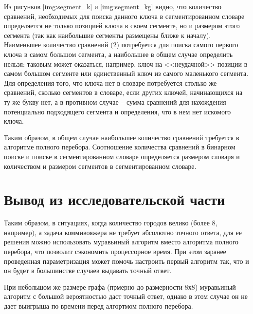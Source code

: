 Из рисунков \ref{img:segment_k} и \ref{img:segment_kg} видно, что количество сравнений, необходимых для поиска данного ключа в сегментированном словаре определяется не только позицией ключа в своем сегменте, но и размером этого сегмента (так как наибольшие сегменты размещены ближе к началу). Наименьшее количество сравнений (2) потребуется для поиска самого первого ключа в самом большом сегмента, а наибольшее в общем случае определить нельзя: таковым может оказаться, например, ключ на <<неудачной>> позиции в самом большом сегменте или единственный ключ из самого маленького сегмента. Для определения того, что ключа нет в словаре потребуется столько же сравнений, сколько сегментов в словаре, если других ключей, начинающихся на ту же букву нет, а в противном случае -- сумма сравнений для нахождения потенциально подходящего сегмента и определения, что в нем нет искомого ключа.

Таким образом, в общем случае наибольшее количество сравнений требуется в алгоритме полного перебора. Соотношение количества сравнений в бинарном поиске и поиске в сегментированном словаре определяется размером словаря и количеством и размером сегментов в сегментированном словаре.

\clearpage
\section{Вывод из исследовательской части}

Таким образом, в ситуациях, когда количество городов велико (более 8, например), а задача коммивояжера не требует абсолютно точного ответа, для ее решения можно использовать муравьиный алгоритм вместо алгоритма полного перебора, что позволит сэкономить процессорное время. При этом заранее проведенная параметризация может помочь настроить первый алгоритм так, что и он будет в большинстве случаев выдавать точный ответ. 

При небольшом же размере графа (прмерно до размерности 8х8) муравьиный алгоритм с большой вероятностью даст точный ответ, однако в этом случае он не дает выигрыша по времени перед алгортмом полного перебора.